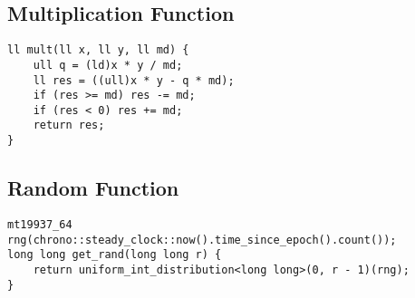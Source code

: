 \documentclass[11pt,a4paper]{article}
\begin{document}
\begin{multicols*}{2}
\subsection{Multiplication Function}
\begin{lstlisting}
ll mult(ll x, ll y, ll md) {
    ull q = (ld)x * y / md;
    ll res = ((ull)x * y - q * md);
    if (res >= md) res -= md;
    if (res < 0) res += md;
    return res;
}
\end{lstlisting}

\subsection{Random Function}
\begin{lstlisting}
mt19937_64 rng(chrono::steady_clock::now().time_since_epoch().count());
long long get_rand(long long r) {
    return uniform_int_distribution<long long>(0, r - 1)(rng);
}
\end{lstlisting}

\end{multicols*}
\end{document}
